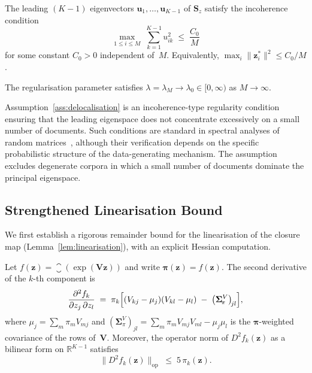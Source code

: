 \begin{assumption}
\label{ass:delocalisation}
The leading $(K{-}1)$ eigenvectors $\mathbf{u}_1,\dots,\mathbf{u}_{K-1}$
of $\mathbf{S}_z$ satisfy the incoherence condition
\begin{equation}
  \max_{1\le i\le M}\;
  \sum_{k=1}^{K-1} u_{ik}^2
  \;\leq\;
  \frac{C_0}{M}
  \label{eq:delocalisation}
\end{equation}
for some constant $C_0>0$ independent of~$M$.
Equivalently, $\max_i \|\mathbf{z}_i^*\|^2 \leq C_0/M$.
\end{assumption}

\begin{assumption}
\label{ass:lambda}
The regularisation parameter satisfies
$\lambda = \lambda_M \to \lambda_0 \in [0,\infty)$ as $M\to\infty$.
\end{assumption}

\begin{remark}
Assumption~\ref{ass:delocalisation} is an incoherence-type regularity
condition ensuring that the leading eigenspace does not concentrate
excessively on a small number of documents. Such conditions are
standard in spectral analyses of random
matrices~\citep{candes2009exact}, although their verification depends
on the specific probabilistic structure of the data-generating
mechanism. The assumption excludes degenerate corpora in which a
small number of documents dominate the principal eigenspace.
\end{remark}

\subsection{Strengthened Linearisation Bound}
\label{subsec:strengthened_lemma}

We first establish a rigorous remainder bound for the linearisation of
the closure map (Lemma~\ref{lem:linearisation}), with an explicit
Hessian computation.

\begin{lemma}
\label{lem:hessian}
Let $f(\mathbf{z}) = \closure(\exp(\mathbf{V}\mathbf{z}))$ and write
$\boldsymbol{\pi}(\mathbf{z}) = f(\mathbf{z})$.
The second derivative of the $k$-th component is
\begin{equation}
  \frac{\partial^2 f_k}{\partial z_j\,\partial z_l}
  \;=\;
  \pi_k
  \Bigl[
    (V_{kj}-\mu_j)(V_{kl}-\mu_l)
    \;-\;
    \bigl(\boldsymbol{\Sigma}_{\!\pi}^{V}\bigr)_{\!jl}
  \Bigr],
  \label{eq:hessian_fk}
\end{equation}
where $\mu_j = \sum_m\pi_m V_{mj}$ and
$(\boldsymbol{\Sigma}_{\!\pi}^{V})_{jl}
 = \sum_m\pi_m V_{mj}V_{ml} - \mu_j\mu_l$
is the $\boldsymbol{\pi}$-weighted covariance of the rows
of~$\mathbf{V}$.
Moreover, the operator norm of $D^2\!f_k(\mathbf{z})$ as a bilinear
form on $\mathbb{R}^{K-1}$ satisfies
\begin{equation}
  \|D^2\!f_k(\mathbf{z})\|_{\mathrm{op}}
  \;\leq\;
  5\,\pi_k(\mathbf{z}).
  \label{eq:hessian_bound}
\end{equation}
\end{lemma}

